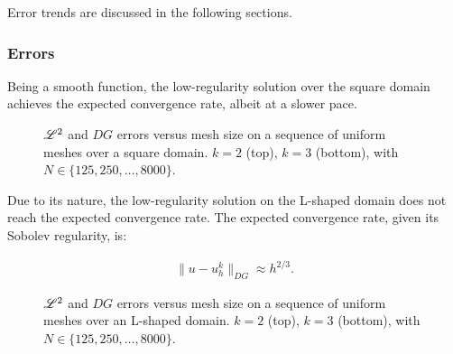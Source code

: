Error trends are discussed in the following sections.

\newpage
\subsubsection{Errors}

Being a smooth function, the low-regularity solution over the square domain achieves the expected convergence rate, albeit at a slower pace.

\begin{figure}[!ht]
    
    
    \caption{$\mathscr{L}^2$ and $DG$ errors versus mesh size on a sequence of uniform meshes over a square domain. $k = 2$ (top), $k = 3$ (bottom), with $N \in \{125, 250, \dots, 8000\}$.}
\end{figure}

\newpage

Due to its nature, the low-regularity solution on the L-shaped domain does not reach the expected convergence rate. The expected convergence rate, given its Sobolev regularity, is:

\begin{gather}
    \lVert u - u^k_h \rVert_{DG} \approx h^{2/3}.
\end{gather}

\begin{figure}[!ht]
    
    
    \caption{$\mathscr{L}^2$ and $DG$ errors versus mesh size on a sequence of uniform meshes over an L-shaped domain. $k = 2$ (top), $k = 3$ (bottom), with $N \in \{125, 250, \dots, 8000\}$.}
\end{figure}